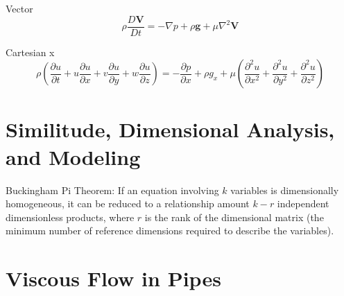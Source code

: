 \documentclass{article}
\begin{document}
Vector
\begin{equation}
  \rho\frac{D\mathbf{V}}{Dt} = -\nabla p + \rho\mathbf{g} + \mu \nabla^2\mathbf{V}
\end{equation}

Cartesian x
\begin{equation}
  \rho\left( \frac{\partial u}{\partial t} + u\frac{\partial u}{\partial x} + v\frac{\partial u}{\partial y} + w\frac{\partial u}{\partial z}\right) = -\frac{\partial p}{\partial x} + \rho g_x + \mu\left( \frac{\partial^2 u}{\partial x^2} + \frac{\partial^2 u}{\partial y^2} + \frac{\partial^2 u}{\partial z^2}\right)
\end{equation}
%
%
\newpage
\section{Similitude, Dimensional Analysis, and Modeling}

Buckingham Pi Theorem: If an equation involving $k$ variables is dimensionally homogeneous, it can be reduced to a relationship amount $k - r$ independent dimensionless products, where $r$ is the rank of the dimensional matrix (the minimum number of reference dimensions required to describe the variables).


%
%
\newpage
\section{Viscous Flow in Pipes}
\end{document}
